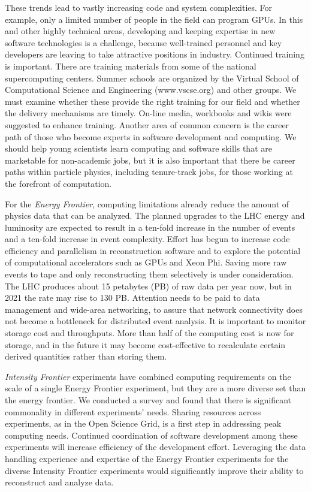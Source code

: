 These trends lead to vastly increasing code and system complexities. For
example, only a limited number of people in the field can program GPUs. In
this and other highly technical areas, developing and keeping expertise in
new software technologies is a challenge, because well-trained personnel and
key developers are leaving to take attractive positions in industry.
Continued training is important.  There are training materials
from some of the national supercomputing centers.  Summer schools are
organized by the Virtual School of Computational Science and
Engineering (www.vscse.org) and other groups. 
We must examine whether these provide the
right training for our field and whether the delivery mechanisms are
timely.  On-line media, workbooks and wikis were suggested to enhance
training. Another area of common concern is the career path of those who
become experts in software development and computing. We should help
young scientists learn computing and software skills that are marketable
for non-academic jobs, but it is also important that there be career paths
within particle physics, including tenure-track jobs, for those working at
the forefront of computation.

For the {\it Energy Frontier}, computing limitations already
reduce the amount of physics data that can be analyzed. The
planned upgrades to the LHC energy and luminosity are expected to result in
a ten-fold increase in the number of events and a ten-fold increase in
event complexity. Effort has begun to increase code efficiency and
parallelism in reconstruction software and to explore the potential of
computational accelerators such as GPUs and Xeon Phi.
Saving more raw events to tape and only
reconstructing them selectively is under consideration. 
The LHC produces about 15 petabytes (PB) of raw data per
year now, but in 2021 the rate may rise to 130 PB. Attention needs to be
paid to data management and wide-area networking, to assure that network
connectivity does not become a bottleneck for distributed event
analysis. It is important to monitor storage cost and throughputs. More
than half of the computing cost is now for storage, and in the future it
may become cost-effective to recalculate certain derived quantities rather
than storing them.

{\it Intensity Frontier} experiments have combined computing requirements
on the scale of a single Energy Frontier experiment, but they are a more
diverse set than the energy frontier.  We conducted a survey and found that
there is significant commonality in different experiments' needs. Sharing
resources across experiments, as in the Open Science Grid, is a first step
in addressing peak computing needs.  Continued coordination of
software development among these experiments will increase efficiency of
the development effort.
Leveraging the data handling experience and
expertise of the Energy Frontier experiments for the diverse Intensity
Frontier experiments would significantly improve their ability to reconstruct
and analyze data.

